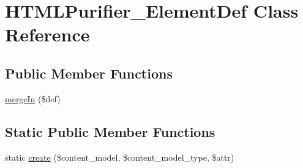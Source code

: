 \hypertarget{classHTMLPurifier__ElementDef}{\section{H\+T\+M\+L\+Purifier\+\_\+\+Element\+Def Class Reference}
\label{classHTMLPurifier__ElementDef}
}
\subsection*{Public Member Functions}
\begin{DoxyCompactItemize}
\item 
\hyperlink{classHTMLPurifier__ElementDef_a1b64a7a4cebe332edc6f190a5ac9d84e}{merge\+In} (\$def)
\end{DoxyCompactItemize}
\subsection*{Static Public Member Functions}
\begin{DoxyCompactItemize}
\item 
static \hyperlink{classHTMLPurifier__ElementDef_af9cb4f37c0de548d6240c7c0372a0277}{create} (\$content\+\_\+model, \$content\+\_\+model\+\_\+type, \$attr)
\end{DoxyCompactItemize}
